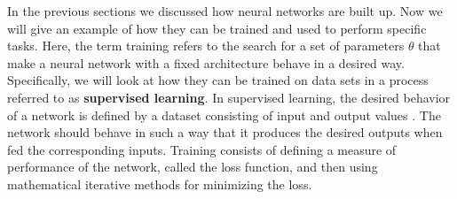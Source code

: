 In the previous sections we discussed how neural networks are built up. Now we will give an example of how they can be trained and used to perform specific tasks. Here, the term training refers to the search for a set of parameters $\theta$ that make a neural network with a fixed architecture behave in a desired way. Specifically, we will look at how they can be trained on data sets in a process referred to as \textbf{supervised learning}. In supervised learning, the desired behavior of a network is defined by a dataset consisting of input and output values \cite{SupervisedLearningOverview}. The network should behave in such a way that it produces the desired outputs when fed the corresponding inputs. Training consists of defining a measure of performance of the network, called the loss function, and then using mathematical iterative methods for minimizing the loss.

